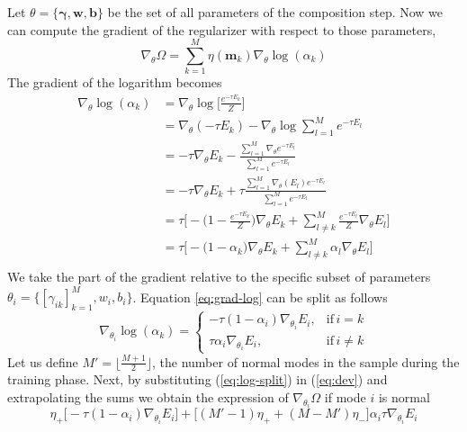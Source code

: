 \documentclass[12pt]{report}
\begin{document}
\indent Let $\theta = \{ \bm{\gamma}, \mathbf{w}, \mathbf{b}\}$ be the set of all parameters of the composition step. Now we can compute the gradient of the regularizer with respect to those parameters,
\begin{equation}
\nabla_{\theta} \Omega =\sum_{k=1}^M \eta(\textbf{m}_k) \nabla_{\theta} \log(\alpha_k) 
\label{eq:dev}
\end{equation}
The gradient of the logarithm becomes
\begin{equation}
\begin{split}  
\nabla_{\theta}  \log(\alpha_k) &= \nabla_{\theta} \log \bigg[ \frac{e^{-\tau E_k}}{Z} \bigg] \\
&=  \nabla_{\theta}(-\tau E_k) -  \nabla_{\theta} \log \sum_{l=1}^M e^{-\tau E_l} \\
&=  -\tau \nabla_{\theta}E_k - \frac{\sum_{l=1}^M \nabla_{\theta} e^{-\tau E_l}}{\sum_{l=1}^M e^{-\tau E_l}} \\
&= -\tau \nabla_{\theta}E_k + \tau \frac{\sum_{l=1}^M \nabla_{\theta}(E_l) e^{-\tau E_l}}{\sum_{l=1}^M e^{-\tau E_l}} \\
&= \tau \Bigg[ -\big(1 - \frac{e^{-\tau E_k}}{Z}\big)\nabla_{\theta}E_k + \sum_{l \neq k}^M \frac{e^{-\tau E_l}}{Z} \nabla_{\theta}E_l \Bigg] \\
&= \tau \Bigg[ -\big(1 - \alpha_k\big)\nabla_{\theta}E_k + \sum_{l \neq k}^M \alpha_l \nabla_{\theta}E_l \Bigg] \\
\end{split}
\label{eq:grad-log}
\end{equation}
We take the part of the gradient relative to the specific subset of parameters $\theta_i = \{[\gamma_{ik}]_{k=1}^M, w_i, b_i\}$. Equation \ref{eq:grad-log} can be split as follows
\begin{equation}
\nabla_{\theta_i}  \log(\alpha_k) = \begin{cases}
      -\tau(1-\alpha_i)\nabla_{\theta_i}E_i, & \text{if}\, i = k \\
       \tau\alpha_i\nabla_{\theta_i}E_i, & \text{if}\, i \neq k
    \end{cases}
\label{eq:log-split}
\end{equation}
Let us define $M' = \lfloor \frac{M+1}{2} \rfloor$, the number of normal modes in the sample during the training phase. Next, by substituting (\ref{eq:log-split}) in (\ref{eq:dev}) and extrapolating the sums we obtain the expression of $\nabla_{\theta_i}\Omega$ if mode $i$ is normal
\begin{equation}
\eta_+\big[ -\tau(1-\alpha_i)\nabla_{\theta_i}E_i \big] + \big[(M'-1)\eta_+ + (M-M')\eta_-\big]\alpha_i\tau\nabla_{\theta_i}E_i
\label{eq:normal-exp}
\end{equation}
\end{document}
